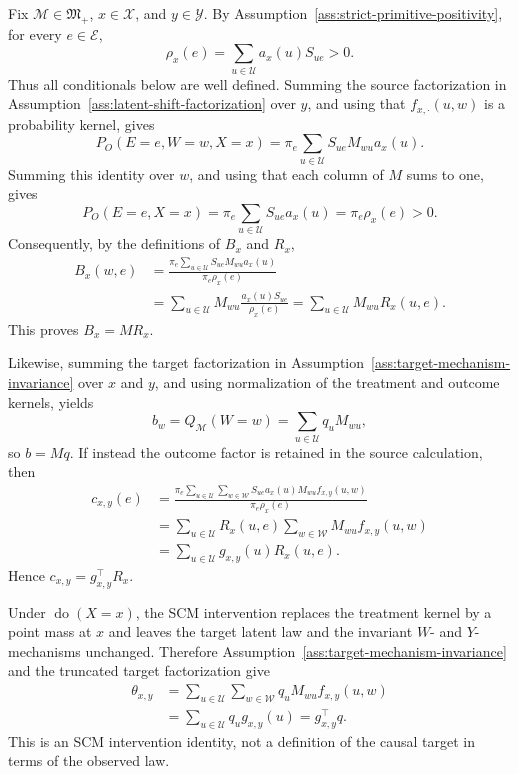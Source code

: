 Fix \(\mathcal M\in\mathfrak M_{+}\), \(x\in\mathcal X\), and \(y\in\mathcal Y\).  By Assumption~\ref{ass:strict-primitive-positivity}, for every \(e\in\mathcal E\),
\[
\rho_x(e)=\sum_{u\in\mathcal U}a_x(u)S_{ue}>0.
\]
Thus all conditionals below are well defined.  Summing the source factorization in Assumption~\ref{ass:latent-shift-factorization} over \(y\), and using that \(f_{x,\cdot}(u,w)\) is a probability kernel, gives
\[
P_O(E=e,W=w,X=x)
=\pi_e\sum_{u\in\mathcal U}S_{ue}M_{wu}a_x(u).
\]
Summing this identity over \(w\), and using that each column of \(M\) sums to one, gives
\[
P_O(E=e,X=x)=\pi_e\sum_{u\in\mathcal U}S_{ue}a_x(u)
=\pi_e\rho_x(e)>0.
\]
Consequently, by the definitions of \(B_x\) and \(R_x\),
\[
\begin{aligned}
B_x(w,e)
&=\frac{\pi_e\sum_{u\in\mathcal U}S_{ue}M_{wu}a_x(u)}
        {\pi_e\rho_x(e)}\\
&=\sum_{u\in\mathcal U}M_{wu}
  \frac{a_x(u)S_{ue}}{\rho_x(e)}
=\sum_{u\in\mathcal U}M_{wu}R_x(u,e).
\end{aligned}
\]
This proves \(B_x=MR_x\).

Likewise, summing the target factorization in Assumption~\ref{ass:target-mechanism-invariance} over \(x\) and \(y\), and using normalization of the treatment and outcome kernels, yields
\[
b_w=Q_{\mathcal M}(W=w)
=\sum_{u\in\mathcal U}q_uM_{wu},
\]
so \(b=Mq\).  If instead the outcome factor is retained in the source calculation, then
\[
\begin{aligned}
c_{x,y}(e)
&=\frac{\pi_e\sum_{u\in\mathcal U}\sum_{w\in\mathcal W}
 S_{ue}a_x(u)M_{wu}f_{x,y}(u,w)}
 {\pi_e\rho_x(e)}\\
&=\sum_{u\in\mathcal U}R_x(u,e)
  \sum_{w\in\mathcal W}M_{wu}f_{x,y}(u,w)\\
&=\sum_{u\in\mathcal U}g_{x,y}(u)R_x(u,e).
\end{aligned}
\]
Hence \(c_{x,y}=g_{x,y}^{\top}R_x\).

Under \(\operatorname{do}(X=x)\), the SCM intervention replaces the treatment kernel by a point mass at \(x\) and leaves the target latent law and the invariant \(W\)- and \(Y\)-mechanisms unchanged.  Therefore Assumption~\ref{ass:target-mechanism-invariance} and the truncated target factorization give
\[
\begin{aligned}
\theta_{x,y}
&=\sum_{u\in\mathcal U}\sum_{w\in\mathcal W}
  q_uM_{wu}f_{x,y}(u,w)\\
&=\sum_{u\in\mathcal U}q_ug_{x,y}(u)
=g_{x,y}^{\top}q.
\end{aligned}
\]
This is an SCM intervention identity, not a definition of the causal target in terms of the observed law.


